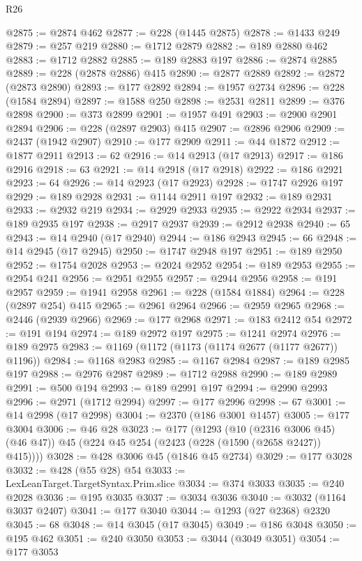 \begin{lexlean}{R26}
\begin{coremodule}
@2875 := @2874 @462
@2877 := @228 (@1445 @2875)
@2878 := @1433 @249
@2879 := @257 @219
@2880 := @1712 @2879
@2882 := @189 @2880 @462
@2883 := @1712 @2882
@2885 := @189 @2883 @197
@2886 := @2874 @2885
@2889 := @228 (@2878 @2886) @415
@2890 := @2877 @2889
@2892 := @2872 (@2873 @2890)
@2893 := @177 @2892
@2894 := @1957 @2734
@2896 := @228 (@1584 @2894)
@2897 := @1588 @250
@2898 := @2531 @2811
@2899 := @376 @2898
@2900 := @373 @2899
@2901 := @1957 @491
@2903 := @2900 @2901 @2894
@2906 := @228 (@2897 @2903) @415
@2907 := @2896 @2906
@2909 := @2437 (@1942 @2907)
@2910 := @177 @2909
@2911 := @44 @1872
@2912 := @1877 @2911
@2913 := 62
@2916 := @14 @2913 (@17 @2913)
@2917 := @186 @2916
@2918 := 63
@2921 := @14 @2918 (@17 @2918)
@2922 := @186 @2921
@2923 := 64
@2926 := @14 @2923 (@17 @2923)
@2928 := @1747 @2926 @197
@2929 := @189 @2928
@2931 := @1144 @2911 @197
@2932 := @189 @2931
@2933 := @2932 @219
@2934 := @2929 @2933
@2935 := @2922 @2934
@2937 := @189 @2935 @197
@2938 := @2917 @2937
@2939 := @2912 @2938
@2940 := 65
@2943 := @14 @2940 (@17 @2940)
@2944 := @186 @2943
@2945 := 66
@2948 := @14 @2945 (@17 @2945)
@2950 := @1747 @2948 @197
@2951 := @189 @2950
@2952 := @1754 @2028
@2953 := @2024 @2952
@2954 := @189 @2953
@2955 := @2954 @241
@2956 := @2951 @2955
@2957 := @2944 @2956
@2958 := @191 @2957
@2959 := @1941 @2958
@2961 := @228 (@1584 @1884)
@2964 := @228 (@2897 @254) @415
@2965 := @2961 @2964
@2966 := @2959 @2965
@2968 := @2446 (@2939 @2966)
@2969 := @177 @2968
@2971 := @183 @2412 @54
@2972 := @191 @194
@2974 := @189 @2972 @197
@2975 := @1241 @2974
@2976 := @189 @2975
@2983 := @1169 (@1172 (@1173 (@1174 @2677 (@1177 @2677)) @1196))
@2984 := @1168 @2983
@2985 := @1167 @2984
@2987 := @189 @2985 @197
@2988 := @2976 @2987
@2989 := @1712 @2988
@2990 := @189 @2989
@2991 := @500 @194
@2993 := @189 @2991 @197
@2994 := @2990 @2993
@2996 := @2971 (@1712 @2994)
@2997 := @177 @2996
@2998 := 67
@3001 := @14 @2998 (@17 @2998)
@3004 := @2370 (@186 @3001 @1457)
@3005 := @177 @3004
@3006 := @46 @28
@3023 := @177
    (@1293
      (@10 (@2316 @3006 @45) (@46 @47))
      @45
      (@224 @45 @254 (@2423 (@228 (@1590 (@2658 @2427)) @415))))
@3028 := @428 @3006 @45 (@1846 @45 @2734)
@3029 := @177 @3028
@3032 := @428 (@55 @28) @54
@3033 := LexLeanTarget.TargetSyntax.Prim.slice
@3034 := @374 @3033
@3035 := @240 @2028
@3036 := @195 @3035
@3037 := @3034 @3036
@3040 := @3032 (@1164 @3037 @2407)
@3041 := @177 @3040
@3044 := @1293 (@27 @2368) @2320
@3045 := 68
@3048 := @14 @3045 (@17 @3045)
@3049 := @186 @3048
@3050 := @195 @462
@3051 := @240 @3050
@3053 := @3044 (@3049 @3051)
@3054 := @177 @3053

\end{coremodule}
\end{lexlean}
